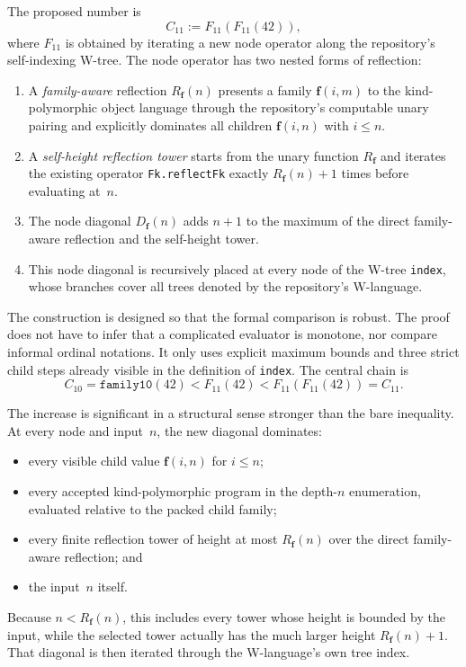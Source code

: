 \documentclass[11pt]{article}
\theoremstyle{definition}
\theoremstyle{remark}
\newcommand{\Cten}{\ensuremath{C_{10}}}
\newcommand{\Celeven}{\ensuremath{C_{11}}}
\newcommand{\Rfam}{\ensuremath{R_{\mathbf f}}}
\newcommand{\Dfam}{\ensuremath{D_{\mathbf f}}}
\newcommand{\code}[1]{\texttt{#1}}
\begin{document}
The proposed number is
\[
  \Celeven := F_{11}(F_{11}(42)),
\]
where $F_{11}$ is obtained by iterating a new node operator along the
repository's self-indexing W-tree. The node operator has two nested forms of
reflection:

\begin{enumerate}[leftmargin=*,label=\arabic*.]
\item A \emph{family-aware} reflection $\Rfam(n)$ presents a family
  $\mathbf f(i,m)$ to the kind-polymorphic object language through the
  repository's computable unary pairing and explicitly dominates all children
  $\mathbf f(i,n)$ with $i\le n$.
\item A \emph{self-height reflection tower} starts from the unary function
  $\Rfam$ and iterates the existing operator \code{Fk.reflectFk} exactly
  $\Rfam(n)+1$ times before evaluating at~$n$.
\item The node diagonal $\Dfam(n)$ adds $n+1$ to the maximum of the direct
  family-aware reflection and the self-height tower.
\item This node diagonal is recursively placed at every node of the W-tree
  \code{index}, whose branches cover all trees denoted by the repository's
  W-language.
\end{enumerate}

The construction is designed so that the formal comparison is robust. The
proof does not have to infer that a complicated evaluator is monotone, nor
compare informal ordinal notations. It only uses explicit maximum bounds and
three strict child steps already visible in the definition of \code{index}.
The central chain is
\[
  \Cten
  = \code{family10}(42)
  < F_{11}(42)
  < F_{11}(F_{11}(42))
  = \Celeven.
\]

The increase is significant in a structural sense stronger than the bare
inequality. At every node and input~$n$, the new diagonal dominates:
\begin{itemize}[leftmargin=*]
\item every visible child value $\mathbf f(i,n)$ for $i\le n$;
\item every accepted kind-polymorphic program in the depth-$n$ enumeration,
  evaluated relative to the packed child family;
\item every finite reflection tower of height at most $\Rfam(n)$ over the
  direct family-aware reflection; and
\item the input~$n$ itself.
\end{itemize}
Because $n<\Rfam(n)$, this includes every tower whose height is bounded by the
input, while the selected tower actually has the much larger height
$\Rfam(n)+1$. That diagonal is then iterated through the W-language's own tree
index.
\end{document}
